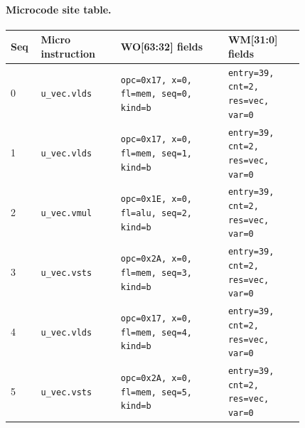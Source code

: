 \paragraph{Microcode site table.}
{\scriptsize
\begin{longtable}{@{}R{0.055\linewidth}L{0.23\linewidth}L{0.31\linewidth}L{0.22\linewidth}@{}}
\toprule
Seq & Micro instruction & WO[63:32] fields & WM[31:0] fields \\
 & \texttt{u\_vec.vlds} & \texttt{opc=0x17, x=0, fl=mem, seq=0, kind=b} & \texttt{entry=39, cnt=2, res=vec, var=0} \\
1 & \texttt{u\_vec.vlds} & \texttt{opc=0x17, x=0, fl=mem, seq=1, kind=b} & \texttt{entry=39, cnt=2, res=vec, var=0} \\
2 & \texttt{u\_vec.vmul} & \texttt{opc=0x1E, x=0, fl=alu, seq=2, kind=b} & \texttt{entry=39, cnt=2, res=vec, var=0} \\
3 & \texttt{u\_vec.vsts} & \texttt{opc=0x2A, x=0, fl=mem, seq=3, kind=b} & \texttt{entry=39, cnt=2, res=vec, var=0} \\
4 & \texttt{u\_vec.vlds} & \texttt{opc=0x17, x=0, fl=mem, seq=4, kind=b} & \texttt{entry=39, cnt=2, res=vec, var=0} \\
5 & \texttt{u\_vec.vsts} & \texttt{opc=0x2A, x=0, fl=mem, seq=5, kind=b} & \texttt{entry=39, cnt=2, res=vec, var=0} \\
\bottomrule
\end{longtable}
}
